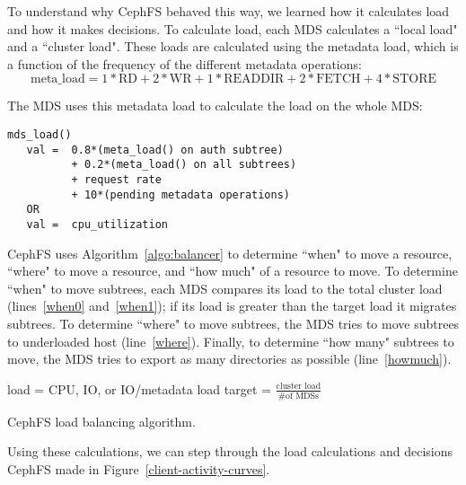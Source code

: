 To understand why CephFS behaved this way, we learned how it calculates load and how it makes decisions. To calculate load, each MDS calculates a ``local load" and a ``cluster load". These loads are calculated using the metadata load, which is a function of the  frequency of the different metadata operations:
\[\text{meta\_load} = 1*\text{RD} + 2*\text{WR} + 1*\text{READDIR} + 2*\text{FETCH} + 4*\text{STORE}\]

\noindent The MDS uses this metadata load to calculate the load on the whole MDS:
\begin{ssp}
\begin{lstlisting}
mds_load()
   val =  0.8*(meta_load() on auth subtree)
          + 0.2*(meta_load() on all subtrees)
          + request rate
          + 10*(pending metadata operations)
   OR
   val =  cpu_utilization
\end{lstlisting}
\end{ssp}

CephFS uses Algorithm~\ref{algo:balancer} to determine ``when" to move a resource, ``where" to move a resource, and ``how much" of a resource to move. To determine ``when" to move subtrees, each MDS compares its load to the total cluster load (lines~\ref{when0} and~\ref{when1}); if its load is greater than the target load it migrates subtrees. To determine ``where" to move subtrees, the MDS tries to move subtrees to underloaded host (line~\ref{where}). Finally, to determine ``how many" subtrees to move, the MDS tries to export as many directories as possible (line~\ref{howmuch}). 

\begin{algorithm}
\begin{ssp}
\DontPrintSemicolon
\small
load = CPU, IO, or IO/metadata load\;
target = \(\frac{\text{cluster load}}{\# \text{of MDSs}}\)\; 
\end{ssp}
\caption{CephFS load balancing algorithm.~\label{algo:balancer}}
\end{algorithm}

Using these calculations, we can step through the load calculations and decisions CephFS made in Figure~\ref{client-activity-curves}.



